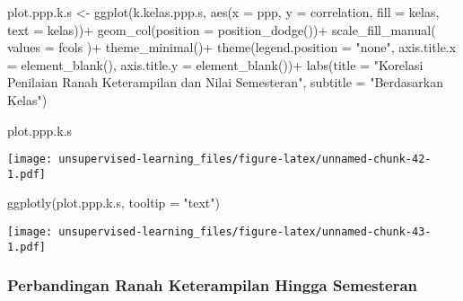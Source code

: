 \documentclass[
]{article}
\newenvironment{Shaded}{\begin{snugshade}}{\end{snugshade}}
\newcommand{\AttributeTok}[1]{\textcolor[rgb]{0.77,0.63,0.00}{#1}}
\newcommand{\FunctionTok}[1]{\textcolor[rgb]{0.00,0.00,0.00}{#1}}
\newcommand{\NormalTok}[1]{#1}
\newcommand{\OtherTok}[1]{\textcolor[rgb]{0.56,0.35,0.01}{#1}}
\newcommand{\SpecialCharTok}[1]{\textcolor[rgb]{0.00,0.00,0.00}{#1}}
\newcommand{\StringTok}[1]{\textcolor[rgb]{0.31,0.60,0.02}{#1}}
\begin{document}
\begin{Shaded}
\begin{Highlighting}[]
\NormalTok{plot.ppp.k.s }\OtherTok{\textless{}{-}}
\FunctionTok{ggplot}\NormalTok{(k.kelas.ppp.s, }\FunctionTok{aes}\NormalTok{(}\AttributeTok{x =}\NormalTok{ ppp, }
                         \AttributeTok{y =}\NormalTok{ correlation,}
                         \AttributeTok{fill =}\NormalTok{ kelas,}
                         \AttributeTok{text =}\NormalTok{ kelas))}\SpecialCharTok{+}
  \FunctionTok{geom\_col}\NormalTok{(}\AttributeTok{position =} \FunctionTok{position\_dodge}\NormalTok{())}\SpecialCharTok{+}
  \FunctionTok{scale\_fill\_manual}\NormalTok{(}
    \AttributeTok{values =}\NormalTok{ fcols}
\NormalTok{  )}\SpecialCharTok{+}
  \FunctionTok{theme\_minimal}\NormalTok{()}\SpecialCharTok{+}
  \FunctionTok{theme}\NormalTok{(}\AttributeTok{legend.position =} \StringTok{"none"}\NormalTok{,}
        \AttributeTok{axis.title.x =} \FunctionTok{element\_blank}\NormalTok{(),}
        \AttributeTok{axis.title.y =} \FunctionTok{element\_blank}\NormalTok{())}\SpecialCharTok{+}
  \FunctionTok{labs}\NormalTok{(}\AttributeTok{title =} \StringTok{"Korelasi Penilaian Ranah Keterampilan dan Nilai Semesteran"}\NormalTok{,}
       \AttributeTok{subtitle =} \StringTok{"Berdasarkan Kelas"}\NormalTok{)}
  

\NormalTok{plot.ppp.k.s}
\end{Highlighting}
\end{Shaded}

\texttt{[image: unsupervised-learning\_files/figure-latex/unnamed-chunk-42-1.pdf]}

\begin{Shaded}
\begin{Highlighting}[]
\FunctionTok{ggplotly}\NormalTok{(plot.ppp.k.s, }\AttributeTok{tooltip =} \StringTok{"text"}\NormalTok{)}
\end{Highlighting}
\end{Shaded}

\texttt{[image: unsupervised-learning\_files/figure-latex/unnamed-chunk-43-1.pdf]}

\hypertarget{perbandingan-ranah-keterampilan-hingga-semesteran}{%
\subsubsection{Perbandingan Ranah Keterampilan Hingga
Semesteran}\label{perbandingan-ranah-keterampilan-hingga-semesteran}}
\end{document}
